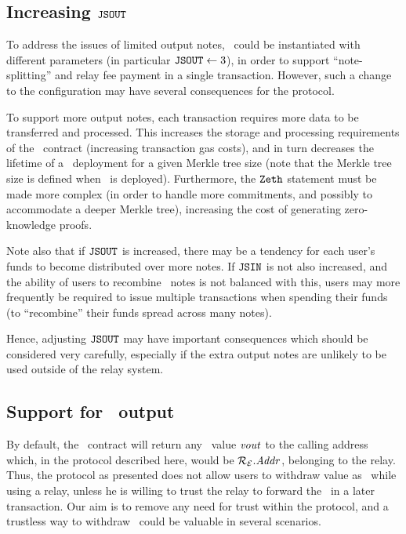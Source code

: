 \subsection{Increasing $\mathtt{JSOUT}$}\label{relay-private-fees:extensions:increasing-jsout}

To address the issues of limited output notes, \zeth~could be instantiated with different parameters (in particular $\mathtt{JSOUT} \gets 3$), in order to support ``note-splitting'' and relay fee payment in a single transaction. However, such a change to the configuration may have several consequences for the protocol.

To support more output notes, each transaction requires more data to be transferred and processed. This increases the storage and processing requirements of the \mixer~contract (increasing transaction gas costs), and in turn decreases the lifetime of a \zeth~deployment for a given Merkle tree size (note that the Merkle tree size is defined when \mixer~is deployed). Furthermore, the $\texttt{Zeth}$ statement must be made more complex (in order to handle more commitments, and possibly to accommodate a deeper Merkle tree), increasing the cost of generating zero-knowledge proofs.

Note also that if $\mathtt{JSOUT}$ is increased, there may be a tendency for each user's funds to become distributed over more notes. If $\mathtt{JSIN}$ is not also increased, and the ability of users to recombine \zeth~notes is not balanced with this, users may more frequently be required to issue multiple transactions when spending their funds (to ``recombine'' their funds spread across many notes).

Hence, adjusting $\mathtt{JSOUT}$ may have important consequences which should be considered very carefully, especially if the extra output notes are unlikely to be used outside of the relay system.

\subsection{Support for \ether~output}\label{relay-private-fees:extensions:ether-output}

By default, the \mixer~contract will return any \ether~value $\mathit{vout}$ to the calling address which, in the protocol described here, would be $\mathcal{{R}_{E}}.\mathit{Addr}$, belonging to the relay. Thus, the protocol as presented does not allow users to withdraw value as \ether~while using a relay, unless he is willing to trust the relay to forward the \ether~in a later transaction. Our aim is to remove any need for trust within the protocol, and a trustless way to withdraw \ether~could be valuable in several scenarios.


